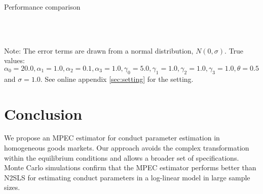 \documentclass[11pt, a4paper]{article}
\begin{document}
\begin{table}[!htbp]
  \begin{center}
      \caption{Performance comparison}
      \label{tb:loglinear_loglinear_sigma_1_simultaneous_non_constraint_theta_constraint_bias_rmse} 
    \\
    \subfloat[MPEC ]{}\\
  \end{center}
  \footnotesize
  Note: The error terms are drawn from a normal distribution, $N(0, \sigma)$. True values: $\alpha_0=20.0,\alpha_1=1.0,\alpha_2=0.1,\alpha_3=1.0,\gamma_0=5.0,\gamma_1=1.0,\gamma_2=1.0,\gamma_3=1.0,\theta=0.5$ and $\sigma=1.0$. See online appendix \ref{sec:setting} for the setting.
\end{table} 



\section{Conclusion}
We propose an MPEC estimator for conduct parameter estimation in homogeneous goods markets.
Our approach avoids the complex transformation within the equilibrium conditions and allows a broader set of specifications. 
Monte Carlo simulations confirm that the MPEC estimator performs better than N2SLS for estimating conduct parameters in a log-linear model in large sample sizes. 
\end{document}
